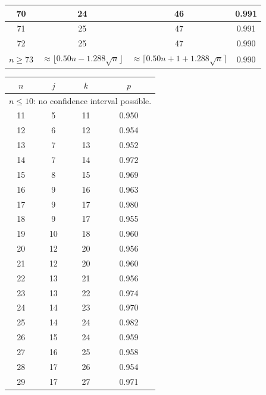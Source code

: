 \begin{table}
\begin{tabular}{|c|c|c|c|}
 70  & 24  & 46 & 0.991  \\ \hline
 71  & 25  & 47 & 0.991  \\ \hline
 72  & 25  & 47 & 0.990  \\ \hline
\hline $n \geq 73$ &
\multicolumn{1}{p{20mm}|}{$\approx \lfloor 0.50 n - 1.288 \sqrt{n}\rfloor$} &
\multicolumn{1}{p{20mm}|}{$\approx \lceil 0.50 n + 1 + 1.288 \sqrt{n}\rceil$} &
0.990 \\ \hline
\end{tabular}
 \hspace{2mm}
\end{table}



\begin{table}\center \scriptsize
\hspace{2mm}
 \begin{tabular}{|c|c|c|c|}
 \hline $n$ & $j$ & $k$ & $p$ \\ \hline \hline
\multicolumn{4}{|c|}{
$n \leq 10 $: no confidence interval possible.}\\ \hline
 11  & 5  & 11 & 0.950  \\ \hline
 12  & 6  & 12 & 0.954  \\ \hline
 13  & 7  & 13 & 0.952  \\ \hline
 14  & 7  & 14 & 0.972  \\ \hline
 15  & 8  & 15 & 0.969  \\ \hline
 16  & 9  & 16 & 0.963  \\ \hline
 17  & 9  & 17 & 0.980  \\ \hline
 18  & 9  & 17 & 0.955  \\ \hline
 19  & 10  & 18 & 0.960  \\ \hline
 20  & 12  & 20 & 0.956  \\ \hline
 21  & 12  & 20 & 0.960  \\ \hline
 22  & 13  & 21 & 0.956  \\ \hline
 23  & 13  & 22 & 0.974  \\ \hline
 24  & 14  & 23 & 0.970  \\ \hline
 25  & 14  & 24 & 0.982  \\ \hline
 26  & 15  & 24 & 0.959  \\ \hline
 27  & 16  & 25 & 0.958  \\ \hline
 28  & 17  & 26 & 0.954  \\ \hline
 29  & 17  & 27 & 0.971  \\ \hline

\end{tabular}
\end{table}
